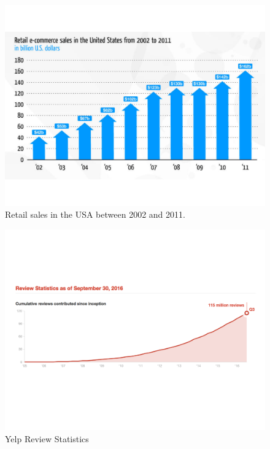 \documentclass{article}
\begin{document}
\begin{figure}[ht]
	\vskip 0.2in
		\begin{center}
			\centerline{\includegraphics[width=\columnwidth]{eCommerce_chart}}
			\caption{Retail sales in the USA between 2002 and 2011.}
			\label{sales}
		\end{center}
	\vskip -0.2in
\end{figure} 

\begin{figure}[ht]
	\vskip 0.2in
		\begin{center}
			\centerline{\includegraphics[width=\columnwidth]{yelp_stats}}
			\caption{Yelp Review Statistics}
			\label{yelp}
		\end{center}
	\vskip -0.2in
\end{figure} 
\end{document}
